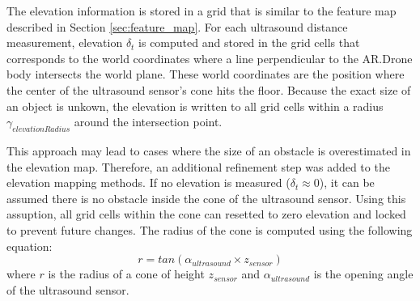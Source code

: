 The elevation information is stored in a grid that is similar to the feature map described in Section \ref{sec:feature_map}.
For each ultrasound distance measurement, elevation $\delta_t$ is computed and stored in the grid cells that corresponds to the world coordinates where a line perpendicular to the AR.Drone body intersects the world plane.
These world coordinates are the position where the center of the ultrasound sensor's cone hits the floor.
Because the exact size of an object is unkown, the elevation is written to all grid cells within a radius $\gamma_{elevationRadius}$ around the intersection point.

This approach may lead to cases where the size of an obstacle is overestimated in the elevation map.
Therefore, an additional refinement step was added to the elevation mapping methods.
If no elevation is measured ($\delta_t \approx 0$), it can be assumed there is no obstacle inside the cone of the ultrasound sensor.
Using this assuption, all grid cells within the cone can resetted to zero elevation and locked to prevent future changes.
The radius of the cone is computed using the following equation:
\begin{equation}
r = tan (\alpha_{ultrasound} \times z_{sensor})
\end{equation}
where $r$ is the radius of a cone of height $z_{sensor}$ and $\alpha_{ultrasound}$ is the opening angle of the ultrasound sensor.

